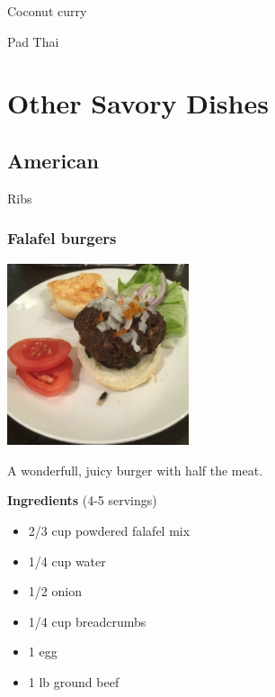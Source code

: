 \documentclass[
]{book}
\providecommand{\tightlist}{%
  \setlength{\itemsep}{0pt}\setlength{\parskip}{0pt}}
\begin{document}
Coconut curry

Pad Thai

\hypertarget{other-savory-dishes}{%
\chapter*{Other Savory Dishes}\label{other-savory-dishes}}

\hypertarget{american}{%
\section*{American}\label{american}}

Ribs

\hypertarget{burger}{%
\subsection*{Falafel burgers}\label{burger}}

\includegraphics[width=0.4\textwidth,height=\textheight]{falafel_burger_small.jpg}

A wonderfull, juicy burger with half the meat.

\begin{blackbox}

\textbf{Ingredients} (4-5 servings)

\begin{itemize}
\tightlist
\item
  2/3 cup powdered falafel mix
\item
  1/4 cup water
\item
  1/2 onion
\item
  1/4 cup breadcrumbs
\item
  1 egg
\item
  1 lb ground beef
\end{itemize}

\end{blackbox}
\end{document}
